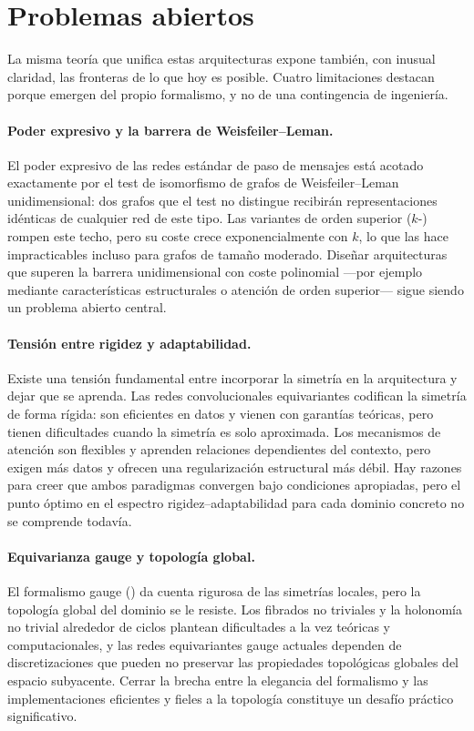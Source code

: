 \section{Problemas abiertos}
\label{sec:concl:open}

La misma teor\'ia que unifica estas arquitecturas expone tambi\'en, con inusual
claridad, las fronteras de lo que hoy es posible. Cuatro limitaciones destacan
porque emergen del propio formalismo, y no de una contingencia de ingenier\'ia.

\paragraph{Poder expresivo y la barrera de Weisfeiler--Leman.}
El poder expresivo de las redes est\'andar de paso de mensajes est\'a acotado
exactamente por el test de isomorfismo de grafos de Weisfeiler--Leman
unidimensional: dos grafos que el test no distingue recibir\'an representaciones
id\'enticas de cualquier red de este tipo. Las variantes de orden superior
($k$-\WL{}) rompen este techo, pero su coste crece exponencialmente con $k$, lo
que las hace impracticables incluso para grafos de tama\~no moderado. Dise\~nar
arquitecturas que superen la barrera unidimensional con coste polinomial ---por
ejemplo mediante caracter\'isticas estructurales o atenci\'on de orden superior---
sigue siendo un problema abierto central.

\paragraph{Tensi\'on entre rigidez y adaptabilidad.}
Existe una tensi\'on fundamental entre incorporar la simetr\'ia en la arquitectura
y dejar que se aprenda. Las redes convolucionales equivariantes codifican la
simetr\'ia de forma r\'igida: son eficientes en datos y vienen con garant\'ias
te\'oricas, pero tienen dificultades cuando la simetr\'ia es solo aproximada. Los
mecanismos de atenci\'on son flexibles y aprenden relaciones dependientes del
contexto, pero exigen m\'as datos y ofrecen una regularizaci\'on estructural m\'as
d\'ebil. Hay razones para creer que ambos paradigmas convergen bajo condiciones
apropiadas, pero el punto \'optimo en el espectro rigidez--adaptabilidad para cada
dominio concreto no se comprende todav\'ia.

\paragraph{Equivarianza gauge y topolog\'ia global.}
El formalismo gauge () da cuenta rigurosa de las simetr\'ias
locales, pero la topolog\'ia global del dominio se le resiste. Los fibrados no
triviales y la holonom\'ia no trivial alrededor de ciclos plantean dificultades a
la vez te\'oricas y computacionales, y las redes equivariantes gauge actuales
dependen de discretizaciones que pueden no preservar las propiedades
topol\'ogicas globales del espacio subyacente. Cerrar la brecha entre la
elegancia del formalismo y las implementaciones eficientes y fieles a la
topolog\'ia constituye un desaf\'io pr\'actico significativo.

